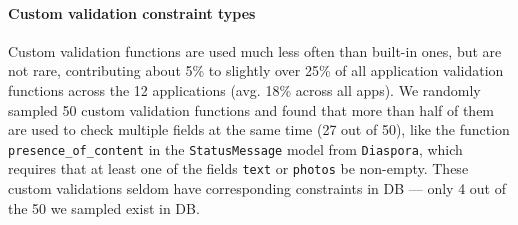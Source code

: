 \paragraph{\bf Custom validation constraint types}
Custom validation functions are used much less often than built-in ones,
but are not rare, contributing about 5\% to slightly over 25\% of all application
validation functions across the 12 applications (avg. 18\% across all apps). 
We randomly sampled 50 custom validation functions
and found that more than half of them are used to check multiple fields at the same time (27 out of 50), like the function {\tt presence\_of\_content} in the
{\tt StatusMessage} model from {\tt Diaspora}, which requires that at least one of the fields {\tt text} or {\tt photos} be non-empty. 
These custom validations seldom have corresponding constraints in DB --- only 4 out of the 50 we sampled exist in DB.  

